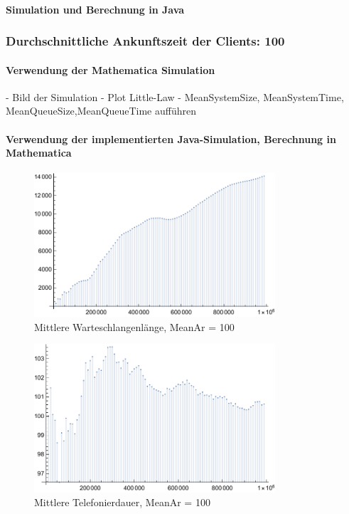 \paragraph{Simulation und Berechnung in Java}


\subsubsection{Durchschnittliche Ankunftszeit der Clients: 100}
\paragraph{Verwendung der Mathematica Simulation}
- Bild der Simulation 
- Plot Little-Law
- MeanSystemSize, MeanSystemTime, MeanQueueSize,MeanQueueTime aufführen

\paragraph{Verwendung der implementierten Java-Simulation, Berechnung in Mathematica}


\begin{figure}[htpb]
	\centering
	\includegraphics[width=0.8\textwidth]{abbildungen/auswertung100/meanQueueTimePlot.pdf}
	\caption{Mittlere Warteschlangenlänge, MeanAr = 100}
	\label{fig:meanQueueTime100}
\end{figure}

\begin{figure}[htpb]
	\centering
	\includegraphics[width=0.8\textwidth]{abbildungen/auswertung100/meanCallingTimePlot.pdf}
	\caption{Mittlere Telefonierdauer, MeanAr = 100}
	\label{fig:meanCallingTime100}
\end{figure}

